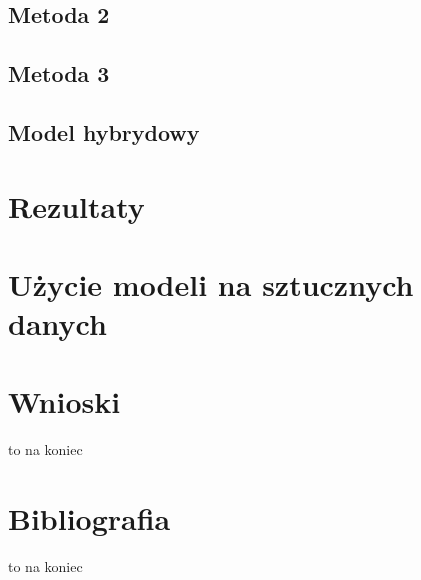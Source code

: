 \documentclass{article}
\begin{document}
\subsection{Metoda 2}
\subsection{Metoda 3}
\subsection{Model hybrydowy}
\section{Rezultaty}
\section{Użycie modeli na sztucznych danych}
\section{Wnioski}
to na koniec
\section{Bibliografia}
to na koniec
\end{document}
